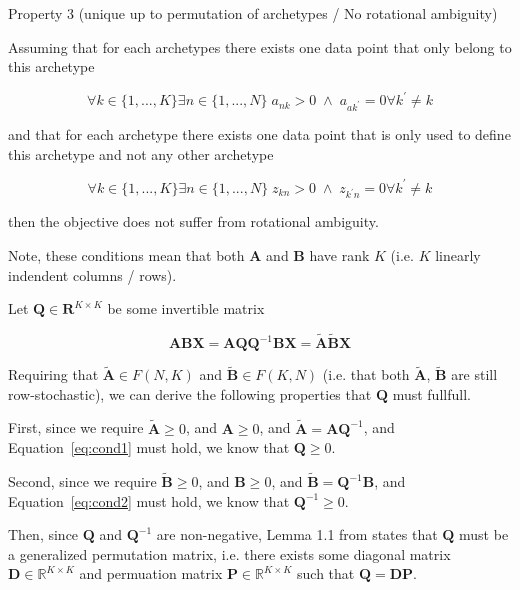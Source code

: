 \documentclass[oneside]{article}
\begin{document}
Property 3 (unique up to permutation of archetypes / No rotational ambiguity) 

Assuming that for each archetypes there exists one data point that only belong to this archetype

\begin{equation}
    \label{eq:cond1}
    \forall k \in \{1, ..., K\} \exists n \in \{1, ..., N\} \; a_{n k} > 0 \; \land \; a_{a k^\prime} = 0 \forall k^\prime \neq k
\end{equation}

and that for each archetype there exists one data point that is only used to define this archetype and not any other archetype

\begin{equation}
    \label{eq:cond2}
    \forall k \in \{1, ..., K\} \exists n \in \{1, ..., N\} \; z_{k n} > 0 \; \land \; z_{k^\prime n} = 0 \forall k^\prime \neq k
\end{equation}

then the objective does not suffer from rotational ambiguity. 

Note, these conditions mean that both $\mathbf{A}$ and $\mathbf{B}$ have rank $K$ (i.e. $K$ linearly indendent columns / rows).

Let $\mathbf{Q} \in \mathbf{R}^{K \times K}$ be some invertible matrix

\begin{equation}
    \mathbf{A} \mathbf{B} \mathbf{X} = \mathbf{A} \mathbf{Q} \mathbf{Q}^{-1} \mathbf{B} \mathbf{X} = \tilde{\mathbf{A}} \tilde{\mathbf{B}} \mathbf{X}
\end{equation}

Requiring that $\tilde{\mathbf{A}} \in F(N, K)$ and $\tilde{\mathbf{B}} \in F(K, N)$ (i.e. that both $\tilde{\mathbf{A}}$, $\tilde{\mathbf{B}}$ are still row-stochastic), we can derive the following properties that $\mathbf{Q}$ must fullfull.

First, since we require $\tilde{\mathbf{A}} \geq 0$, and $\mathbf{A} \geq 0$, and $\tilde{\mathbf{A}} = \mathbf{A} \mathbf{Q}^{-1}$, and Equation~\eqref{eq:cond1} must hold, we know that $\mathbf{Q} \geq 0$.

Second, since we require $\tilde{\mathbf{B}} \geq 0$, and $\mathbf{B} \geq 0$, and $\tilde{\mathbf{B}} = \mathbf{Q}^{-1} \mathbf{B}$, and Equation~\eqref{eq:cond2} must hold, we know that $\mathbf{Q}^{-1} \geq 0$.

Then, since $\mathbf{Q}$ and $\mathbf{Q}^{-1}$ are non-negative, Lemma 1.1 from \autocite{mincNonnegativeMatrices1988} states that $\mathbf{Q}$ must be a generalized permutation matrix, i.e. there exists some diagonal matrix $\mathbf{D} \in \mathbb{R}^{K \times K}$ and permuation matrix $\mathbf{P} \in \mathbb{R}^{K \times K}$ such that $\mathbf{Q} = \mathbf{D} \mathbf{P}$.
\end{document}
